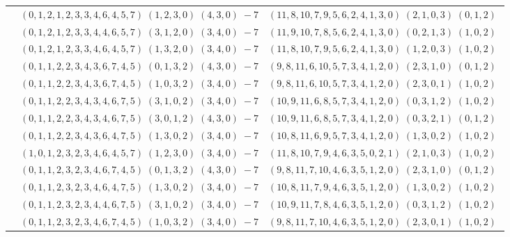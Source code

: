 \documentclass[11pt]{article}
\begin{document}
\begin{longtable}[l]{|c|c|c|}
 \cline{2-3} 
 & $(0 ,1 ,2 ,1 ,2 ,3 ,3 ,4 ,6 ,4 ,5 ,7) \;(1 ,2 ,3 ,0) \;(4 ,3 ,0) \;-7$ & $(11 ,8 ,10 ,7 ,9 ,5 ,6 ,2 ,4 ,1 ,3 ,0) \;(2 ,1 ,0 ,3) \;(0 ,1 ,2) \;$\\ 
 \cline{2-3} 
 & $(0 ,1 ,2 ,1 ,2 ,3 ,3 ,4 ,4 ,6 ,5 ,7) \;(3 ,1 ,2 ,0) \;(3 ,4 ,0) \;-7$ & $(11 ,9 ,10 ,7 ,8 ,5 ,6 ,2 ,4 ,1 ,3 ,0) \;(0 ,2 ,1 ,3) \;(1 ,0 ,2) \;$\\ 
 \cline{2-3} 
 & $(0 ,1 ,2 ,1 ,2 ,3 ,3 ,4 ,6 ,4 ,5 ,7) \;(1 ,3 ,2 ,0) \;(3 ,4 ,0) \;-7$ & $(11 ,8 ,10 ,7 ,9 ,5 ,6 ,2 ,4 ,1 ,3 ,0) \;(1 ,2 ,0 ,3) \;(1 ,0 ,2) \;$\\ 
 \cline{2-3} 
 & $(0 ,1 ,1 ,2 ,2 ,3 ,4 ,3 ,6 ,7 ,4 ,5) \;(0 ,1 ,3 ,2) \;(4 ,3 ,0) \;-7$ & $(9 ,8 ,11 ,6 ,10 ,5 ,7 ,3 ,4 ,1 ,2 ,0) \;(2 ,3 ,1 ,0) \;(0 ,1 ,2) \;$\\ 
 \cline{2-3} 
 & $(0 ,1 ,1 ,2 ,2 ,3 ,4 ,3 ,6 ,7 ,4 ,5) \;(1 ,0 ,3 ,2) \;(3 ,4 ,0) \;-7$ & $(9 ,8 ,11 ,6 ,10 ,5 ,7 ,3 ,4 ,1 ,2 ,0) \;(2 ,3 ,0 ,1) \;(1 ,0 ,2) \;$\\ 
 \cline{2-3} 
 & $(0 ,1 ,1 ,2 ,2 ,3 ,4 ,3 ,4 ,6 ,7 ,5) \;(3 ,1 ,0 ,2) \;(3 ,4 ,0) \;-7$ & $(10 ,9 ,11 ,6 ,8 ,5 ,7 ,3 ,4 ,1 ,2 ,0) \;(0 ,3 ,1 ,2) \;(1 ,0 ,2) \;$\\ 
 \cline{2-3} 
 & $(0 ,1 ,1 ,2 ,2 ,3 ,4 ,3 ,4 ,6 ,7 ,5) \;(3 ,0 ,1 ,2) \;(4 ,3 ,0) \;-7$ & $(10 ,9 ,11 ,6 ,8 ,5 ,7 ,3 ,4 ,1 ,2 ,0) \;(0 ,3 ,2 ,1) \;(0 ,1 ,2) \;$\\ 
 \cline{2-3} 
 & $(0 ,1 ,1 ,2 ,2 ,3 ,4 ,3 ,6 ,4 ,7 ,5) \;(1 ,3 ,0 ,2) \;(3 ,4 ,0) \;-7$ & $(10 ,8 ,11 ,6 ,9 ,5 ,7 ,3 ,4 ,1 ,2 ,0) \;(1 ,3 ,0 ,2) \;(1 ,0 ,2) \;$\\ 
 \cline{2-3} 
 & $(1 ,0 ,1 ,2 ,3 ,2 ,3 ,4 ,6 ,4 ,5 ,7) \;(1 ,2 ,3 ,0) \;(3 ,4 ,0) \;-7$ & $(11 ,8 ,10 ,7 ,9 ,4 ,6 ,3 ,5 ,0 ,2 ,1) \;(2 ,1 ,0 ,3) \;(1 ,0 ,2) \;$\\ 
 \cline{2-3} 
 & $(0 ,1 ,1 ,2 ,3 ,2 ,3 ,4 ,6 ,7 ,4 ,5) \;(0 ,1 ,3 ,2) \;(4 ,3 ,0) \;-7$ & $(9 ,8 ,11 ,7 ,10 ,4 ,6 ,3 ,5 ,1 ,2 ,0) \;(2 ,3 ,1 ,0) \;(0 ,1 ,2) \;$\\ 
 \cline{2-3} 
 & $(0 ,1 ,1 ,2 ,3 ,2 ,3 ,4 ,6 ,4 ,7 ,5) \;(1 ,3 ,0 ,2) \;(3 ,4 ,0) \;-7$ & $(10 ,8 ,11 ,7 ,9 ,4 ,6 ,3 ,5 ,1 ,2 ,0) \;(1 ,3 ,0 ,2) \;(1 ,0 ,2) \;$\\ 
 \cline{2-3} 
 & $(0 ,1 ,1 ,2 ,3 ,2 ,3 ,4 ,4 ,6 ,7 ,5) \;(3 ,1 ,0 ,2) \;(3 ,4 ,0) \;-7$ & $(10 ,9 ,11 ,7 ,8 ,4 ,6 ,3 ,5 ,1 ,2 ,0) \;(0 ,3 ,1 ,2) \;(1 ,0 ,2) \;$\\ 
 \cline{2-3} 
 & $(0 ,1 ,1 ,2 ,3 ,2 ,3 ,4 ,6 ,7 ,4 ,5) \;(1 ,0 ,3 ,2) \;(3 ,4 ,0) \;-7$ & $(9 ,8 ,11 ,7 ,10 ,4 ,6 ,3 ,5 ,1 ,2 ,0) \;(2 ,3 ,0 ,1) \;(1 ,0 ,2) \;$\\ 

\end{longtable}
\end{document}
